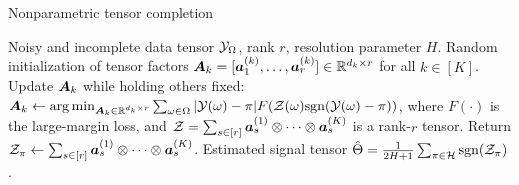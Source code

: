 \documentclass[10pt]{article}
\def\sign{\textup{sgn}}
\newcommand\Algphase[1]{%
\vspace*{-.7\baselineskip}\Statex\hspace*{\dimexpr-\algorithmicindent-2pt\relax}\rule{\textwidth}{0.4pt}%
\Statex\hspace*{-\algorithmicindent}\textbf{#1}%
\vspace*{-.7\baselineskip}\Statex\hspace*{\dimexpr-\algorithmicindent-2pt\relax}\rule{\textwidth}{0.4pt}%
}
\begin{document}
\begin{algorithm}
  \caption{Nonparametric tensor completion}\label{alg:tensorT}
 \begin{algorithmic}[1] 
\INPUT  Noisy and incomplete data tensor $\mathcal{Y}_\Omega$, rank $r$, resolution parameter $H$.
\State Random initialization of tensor factors $\bm A_k=[\bm{a}^{(k)}_1,\ldots,\bm{a}^{(k)}_r]\in\mathbb{R}^{d_k\times r}$ for all $k\in[K]$. 
\State Update $\bm A_k$ while holding others fixed: $\mA_k\leftarrow \argmin_{\mA_k\in\mathbb{R}^{d_k\times r}}\sum_{\omega\in \Omega} |\tY(\omega)-\pi|F(\tZ(\omega)\sign(\tY(\omega)-\pi))$, where $F(\cdot)$ is the large-margin loss, and $\mathcal{Z}=\sum_{s\in[r]} \bm{a}^{(1)}_s\otimes \cdots\otimes \bm{a}^{(K)}_s$ is a rank-$r$ tensor. 
\EndFor
\EndWhile
\State Return $\mathcal{Z}_\pi\leftarrow \sum_{s\in[r]} \bm{a}^{(1)}_s\otimes \cdots\otimes \bm{a}^{(K)}_s$.
\EndFor
\OUTPUT Estimated signal tensor $\hat \Theta={1\over 2H+1}\sum_{\pi \in \tH}\sign(\tZ_\pi)$.
    \end{algorithmic}
\end{algorithm}
\end{document}
